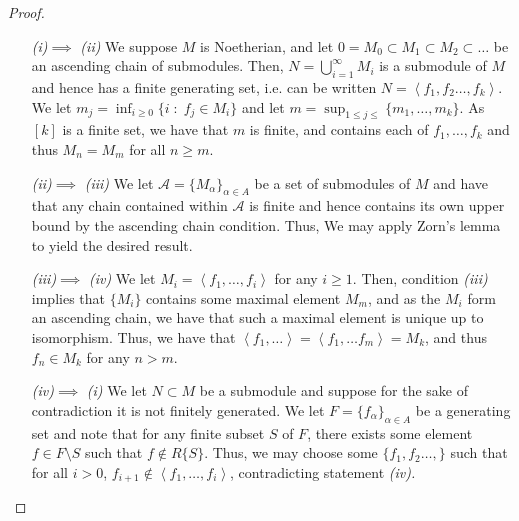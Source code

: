 \documentclass[english]{article}
\newcommand{\Acal}{\mathcal{A}}
\newcommand{\prob}[1]{\setcounter{section}{#1-1}\section{}}
\theoremstyle{remark}
\theoremstyle{definition}
\newcommand{\idl}[1]{\left\langle{#1}\right\rangle }
\begin{document}
\begin{proof}~
	\begin{enumerate}
		\item[\emph{(i)}$\implies$ \emph{(ii)}] We suppose $M$ is Noetherian, and let $0=M_0\subset M_1\subset M_2\subset\hdots$ be an ascending chain of submodules. Then, $N=\bigcup_{i=1}^\infty M_i$ is a submodule of $M$ and hence has a finite generating set, i.e. can be written $N=\idl{f_1,f_2\hdots,f_k}$. We let $m_j=\inf_{i\geq 0}\{i\;:\;f_j\in M_i\}$ and let $m=\sup_{1\leq j \leq }\{m_1,\hdots, m_k\}$. As $[k]$ is a finite set, we have that $m$ is finite, and contains each of $f_1,\hdots,f_k$ and thus $M_n=M_m$ for all $n\geq m$.  
		\item[\emph{(ii)}$\implies$ \emph{(iii)}]
		We let $\Acal=\{M_\alpha\}_{\alpha\in A}$ be a set of submodules of $M$ and have that any chain contained within $\Acal$ is finite and hence contains its own upper bound by the ascending chain condition. Thus, We may apply Zorn's lemma to yield the desired result. 
		\item[\emph{(iii)}$\implies$ \emph{(iv)}]
		We let $M_i=\idl{f_1,\hdots,f_i}$ for any $i\geq 1$. Then, condition \emph{(iii)} implies that $\{M_i\}$ contains some maximal element $M_m$, and as the $M_i$ form an ascending chain, we have that such a maximal element is unique up to isomorphism. Thus, we have that $\idl{f_1,\hdots}=\idl{f_1,\hdots f_m}=M_k$, and thus $f_n\in M_k$ for any $n>m$. 
		\item[\emph{(iv)}$\implies$ \emph{(i)}]
		We let $N\subset M$ be a submodule and suppose for the sake of contradiction it is not finitely generated. We let $F=\{f_\alpha\}_{\alpha\in A}$ be a generating set and note that for any finite subset $S$ of $F$, there exists some element $f\in F\setminus S$ such that $f\notin R\{S\}$. Thus, we may choose some $\{f_1,f_2\hdots,\}$ such that for all $i>0$, $f_{i+1}\notin \idl{f_1,\hdots, f_i}$, contradicting statement \emph{(iv).}
	\end{enumerate}
\end{proof}
	
\prob{2}
\end{document}
